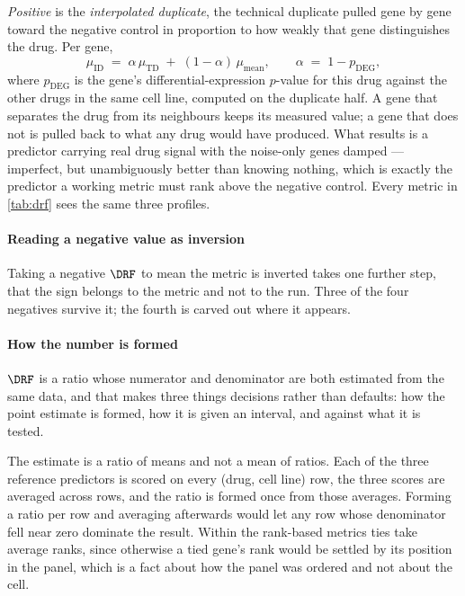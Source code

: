 \emph{Positive} is the \emph{interpolated duplicate}, the technical duplicate
pulled gene by gene toward the negative control in proportion to how weakly that
gene distinguishes the drug. Per gene,
\begin{equation}
 \mu_{\textrm{ID}} \;=\; \alpha\,\mu_{\textrm{TD}}
 \;+\; (1-\alpha)\,\mu_{\textrm{mean}} ,
 \qquad \alpha \;=\; 1 - p_{\textrm{DEG}} ,
\end{equation}
where $p_{\textrm{DEG}}$ is the gene's differential-expression $p$-value for this
drug against the other drugs in the same cell line, computed on the duplicate
half. A gene that separates the drug from its neighbours keeps its measured
value; a gene that does not is pulled back to what any drug would have produced.
What results is a predictor carrying real drug signal with the noise-only genes
damped --- imperfect, but unambiguously better than knowing nothing, which is
exactly the predictor a working metric must rank above the negative control.
Every metric in \cref{tab:drf} sees the same three profiles.

\paragraph{Reading a negative value as inversion} Taking a negative $\DRF$ to
mean the metric is inverted takes one further step, that the sign belongs to the
metric and not to the run. Three of the four negatives survive it; the fourth is carved out where it
appears.

\paragraph{How the number is formed} $\DRF$ is a ratio whose numerator and
denominator are both estimated from the same data, and that makes three things
decisions rather than defaults: how the point estimate is formed, how it is given
an interval, and against what it is tested.

The estimate is a ratio of means and not a mean of ratios. Each of the three
reference predictors is scored on every (drug, cell line) row, the three scores
are averaged across rows, and the ratio is formed once from those averages.
Forming a ratio per row and averaging afterwards would let any row whose
denominator fell near zero dominate the result. Within the rank-based metrics
ties take average ranks, since otherwise a tied gene's rank would be settled by
its position in the panel, which is a fact about how the panel was ordered and
not about the cell.

